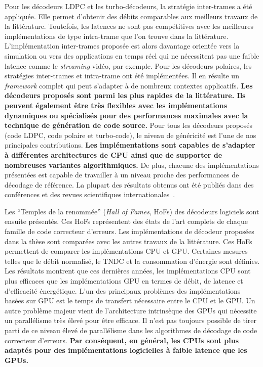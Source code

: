 Pour les décodeurs LDPC et les turbo-décodeurs, la stratégie inter-trames a été
appliquée. Elle permet d'obtenir des débits comparables aux meilleurs travaux de
la littérature. Toutefois, les latences ne sont pas compétitives avec les
meilleures implémentations de type intra-trame que l'on trouve dans la
littérature. L'implémentation inter-trames proposée est alors davantage
orientée vers la simulation ou vers des applications en temps réel qui ne
nécessitent pas une faible latence comme le \emph{streaming} vidéo, par exemple.
Pour les décodeurs polaires, les stratégies inter-trames et intra-trame ont
été implémentées. Il en résulte un \emph{framework} complet qui peut s'adapter à
de nombreux contextes applicatifs. \textbf{Les décodeurs proposés sont parmi les
plus rapides de la littérature. Ils peuvent également être très flexibles avec
les implémentations dynamiques ou spécialisés pour des performances maximales
avec la technique de génération de code source.} Pour tous les décodeurs
proposés (code LDPC, code polaire et turbo-code), le niveau de généricité est
l'une de nos principales contributions. \textbf{Les implémentations sont
capables de s'adapter à différentes architectures de CPU ainsi que de supporter
de nombreuses variantes algorithmiques.} De plus, chacune des implémentations
présentées est capable de travailler à un niveau proche des performances de
décodage de référence. La plupart des résultats obtenus ont été publiés dans des
conférences et des revues scientifiques internationales~\cite{Ghaffari2019,
Leonardon2019,Cassagne2015c,Cassagne2016b,Cassagne2016a}.

Les ``Temples de la renommée'' (\emph{Hall of Fames}, HoFs) des décodeurs
logiciels sont ensuite présentés. Ces HoFs représentent des états de l'art
complets de chaque famille de code correcteur d'erreurs. Les implémentations de
décodeur proposées dans la thèse sont comparées avec les autres travaux de la
littérature. Ces HoFs permettent de comparer les implémentations CPU et GPU.
Certaines mesures telles que le débit normalisé, le TNDC et la consommation
d'énergie sont définies. Les résultats montrent que ces dernières années, les
implémentations CPU sont plus efficaces que les implémentations GPU en termes de
débit, de latence et d'efficacité énergétique. L'un des principaux problèmes des
implémentations basées sur GPU est le temps de transfert nécessaire entre le
CPU et le GPU. Un autre problème majeur vient de l'architecture intrinsèque des
GPUs qui nécessite un parallélisme très élevé pour être efficace. Il n'est pas
toujours possible de tirer parti de ce niveau élevé de parallélisme dans les
algorithmes de décodage de code correcteur d'erreurs. \textbf{Par conséquent, en
général, les CPUs sont plus adaptés pour des implémentations logicielles à
faible latence que les GPUs.}

